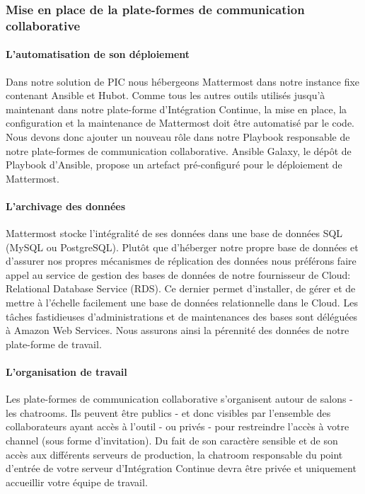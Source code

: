         \subsubsection{Mise en place de la plate-formes de communication collaborative}

          \paragraph{L'automatisation de son déploiement}
          Dans notre solution de PIC nous hébergeons Mattermost dans notre instance fixe contenant Ansible et Hubot. Comme tous les autres outils utilisés jusqu'à maintenant dans notre plate-forme d'Intégration Continue, la mise en place, la configuration et la maintenance de Mattermost doit être automatisé par le code. Nous devons donc ajouter un nouveau rôle dans notre Playbook responsable de notre plate-formes de communication collaborative. Ansible Galaxy, le dépôt de Playbook d'Ansible, propose un artefact pré-configuré pour le déploiement de Mattermost.

          \paragraph{L'archivage des données}
          Mattermost stocke l'intégralité de ses données dans une base de données SQL (MySQL ou PostgreSQL). Plutôt que d'héberger notre propre base de données et d'assurer nos propres mécanismes de réplication des données nous préférons faire appel au service de gestion des bases de données de notre fournisseur de Cloud: Relational Database Service (RDS). Ce dernier permet d'installer, de gérer et de mettre à l'échelle facilement une base de données relationnelle dans le Cloud. Les tâches fastidieuses d'administrations et de maintenances des bases sont déléguées à Amazon Web Services. Nous assurons ainsi la pérennité des données de notre plate-forme de travail.

          \paragraph{L'organisation de travail}
          Les plate-formes de communication collaborative s'organisent autour de salons - les chatrooms. Ils peuvent être publics - et donc visibles par l'ensemble des collaborateurs ayant accès à l'outil - ou privés - pour restreindre l'accès à votre channel (sous forme d'invitation). Du fait de son caractère sensible et de son accès aux différents serveurs de production, la chatroom responsable du point d'entrée de votre serveur d'Intégration Continue devra être privée et uniquement accueillir votre équipe de travail.

